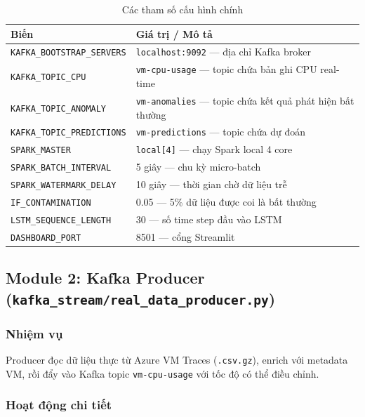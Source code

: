 \documentclass[12pt,a4paper]{article}
\begin{document}
\begin{table}[H]
\centering
\begin{tabularx}{\linewidth}{l X}
\toprule
\textbf{Biến} & \textbf{Giá trị / Mô tả} \\
\midrule
\texttt{KAFKA\_BOOTSTRAP\_SERVERS} & \texttt{localhost:9092} — địa chỉ Kafka broker \\
\texttt{KAFKA\_TOPIC\_CPU} & \texttt{vm-cpu-usage} — topic chứa bản ghi CPU real-time \\
\texttt{KAFKA\_TOPIC\_ANOMALY} & \texttt{vm-anomalies} — topic chứa kết quả phát hiện bất thường \\
\texttt{KAFKA\_TOPIC\_PREDICTIONS} & \texttt{vm-predictions} — topic chứa dự đoán \\
\texttt{SPARK\_MASTER} & \texttt{local[4]} — chạy Spark local 4 core \\
\texttt{SPARK\_BATCH\_INTERVAL} & 5 giây — chu kỳ micro-batch \\
\texttt{SPARK\_WATERMARK\_DELAY} & 10 giây — thời gian chờ dữ liệu trễ \\
\texttt{IF\_CONTAMINATION} & 0.05 — 5\% dữ liệu được coi là bất thường \\
\texttt{LSTM\_SEQUENCE\_LENGTH} & 30 — số time step đầu vào LSTM \\
\texttt{DASHBOARD\_PORT} & 8501 — cổng Streamlit \\
\bottomrule
\end{tabularx}
\caption{Các tham số cấu hình chính}
\end{table}

\subsection{Module 2: Kafka Producer (\texttt{kafka\_stream/real\_data\_producer.py})}

\subsubsection{Nhiệm vụ}
Producer đọc dữ liệu thực từ Azure VM Traces (\texttt{.csv.gz}), enrich với metadata VM, rồi đẩy vào Kafka topic \texttt{vm-cpu-usage} với tốc độ có thể điều chỉnh.

\subsubsection{Hoạt động chi tiết}
\end{document}
